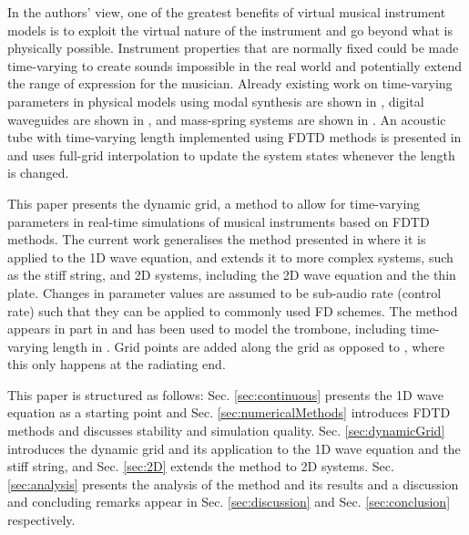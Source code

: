 \documentclass[fleqn]{jaes}
\begin{document}
In the authors' view, one of the greatest  benefits of virtual musical instrument models is to exploit the virtual nature of the instrument and go beyond what is physically possible. Instrument properties that are normally fixed could be made time-varying to create sounds impossible in the real world and potentially extend the range of expression for the musician. Already existing work on time-varying parameters in physical models using modal synthesis \cite{morrison1993mosaic} are shown in \cite{Mehes2016, Willemsen2017}, digital waveguides \cite{Smith1992} are shown in \cite{Michon2014, serafin2005virtual}, and mass-spring systems are shown in \cite{leonard2013virtual}. An acoustic tube with time-varying length implemented using FDTD methods is presented in \cite{Hofmann2019} and uses full-grid interpolation to update the system states whenever the length is changed.

This paper presents the dynamic grid, a method to allow for time-varying parameters in real-time simulations of musical instruments based on FDTD methods. The current work generalises the method presented in \cite{Willemsen2021a} where it is applied to the 1D wave equation, and extends it to more complex systems, such as the stiff string, and 2D systems, including the 2D wave equation and the thin plate. Changes in parameter values are assumed to be sub-audio rate (control rate) such that they can be applied to commonly used FD schemes.
The method appears in part in \cite[Ch. 12]{Willemsen2021Thesis} and has been used to model the trombone, including time-varying length in \cite{Willemsen2021b}. Grid points are added along the grid as opposed to \cite{Hofmann2019}, where this only happens at the radiating end. 

This paper is structured as follows: Sec. \ref{sec:continuous} presents the 1D wave equation as a starting point and Sec. \ref{sec:numericalMethods} introduces FDTD methods and discusses stability and simulation quality. Sec. \ref{sec:dynamicGrid} introduces the dynamic grid and its application to the 1D wave equation and the stiff string, and Sec. \ref{sec:2D} extends the method to 2D systems. Sec. \ref{sec:analysis} presents the analysis of the method and its results and a discussion and concluding remarks appear in Sec. \ref{sec:discussion} and Sec. \ref{sec:conclusion} respectively.
\end{document}
